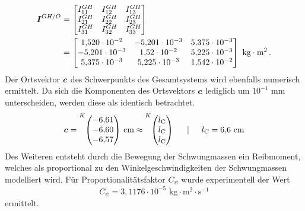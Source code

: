 \begin{equation}
\begin{split}
\boldsymbol{I}^{GH/O} &= \begin{bmatrix}
I^{GH}_{\text{11}} & I^{GH}_{\text{12}} & I^{GH}_{\text{13}} \\
I^{GH}_{\text{21}} & I^{GH}_{\text{22}} & I^{GH}_{\text{23}} \\
I^{GH}_{\text{31}} & I^{GH}_{\text{32}} & I^{GH}_{\text{33}}
\end{bmatrix} \\
&=
\begin{bmatrix}
1{,}520\cdot 10^{-2} & -5{,}201\cdot 10^{-3} & 5{,}375\cdot 10^{-3} \\
-5{,}201\cdot 10^{-3} & 1{,}52\cdot 10^{-2} & 5{,}225\cdot 10^{-3} \\
5{,}375\cdot 10^{-3} & 5{,}225\cdot 10^{-3} & 1{,}542\cdot 10^{-2}
\end{bmatrix}\text{ kg}\cdot \text{m}^2 \,.
\end{split}
\end{equation}
Der Ortsvektor $\boldsymbol{c}$ des Schwerpunkts des Gesamtsystems wird ebenfalls numerisch ermittelt. Da sich die Komponenten des Ortsvektors $\boldsymbol{c}$ lediglich um $10^{-1}\text{ mm}$ unterscheiden, werden diese als identisch betrachtet.
\begin{equation}
\bs{c} = \vecBS{K}{-6{,}61}{-6{,}60}{-6{,}57}\text{ cm} \approx \vecBS{K}{l\idx{C}}{l\idx{C}}{l\idx{C}} \hspace{15pt} \vert \hspace{15pt} l\idx{C} = 6{,}6\text{ cm}
\end{equation}
Des Weiteren entsteht durch die Bewegung der Schwungmassen ein Reibmoment, welches als proportional zu den Winkelgeschwindigkeiten der Schwungmassen modelliert wird. Für Proportionalitätsfaktor $C_{\psi}$ wurde experimentell der  Wert 
\begin{equation}
C_{\psi} = 3{,}1176\cdot 10^{-5}\text{ kg}\cdot \text{m}^2 \cdot \text{s}^{-1}
\end{equation}
ermittelt.